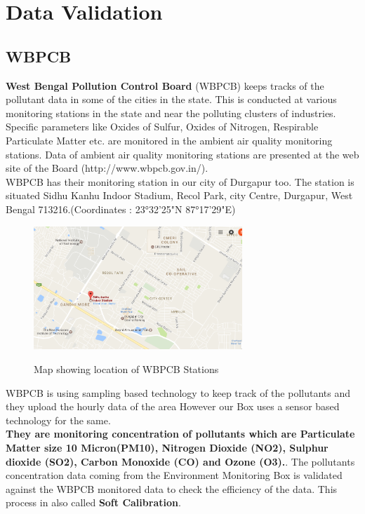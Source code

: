\chapter{Data Validation}

\section{WBPCB}

\textbf{West Bengal Pollution Control Board} (WBPCB) keeps tracks of the pollutant data in some of the cities in the state. This is conducted at various monitoring stations in the state and near the polluting clusters of industries. Specific parameters like Oxides of Sulfur, Oxides of Nitrogen, Respirable Particulate Matter etc. are monitored in the ambient air quality monitoring stations. Data of ambient air quality monitoring stations are presented at the web site of the Board (http://www.wbpcb.gov.in/). \\

WBPCB has their monitoring station in our city of Durgapur too. The station is situated Sidhu Kanhu Indoor Stadium, Recol Park, city Centre, Durgapur, West Bengal 713216.(Coordinates : 23°32'25"N   87°17'29"E)

\vspace{0.1in}

\begin{figure}[!htbp]
	\centering
	\includegraphics[width=0.7\textwidth]{wbpcb.png}
	\label{fig:Map showing location of WBPCB Stations}
	\caption{Map showing location of WBPCB Stations}
\end{figure}

WBPCB is using sampling based technology to keep track of the pollutants and they upload the hourly data of the area However our Box uses a sensor based technology for the same.\\

\textbf{They are monitoring concentration of pollutants which are Particulate Matter size 10 Micron(PM10), Nitrogen Dioxide (NO2), Sulphur dioxide (SO2), Carbon Monoxide (CO) and Ozone (O3).}.
The pollutants concentration data coming from the Environment Monitoring Box is validated against the WBPCB monitored data to check the efficiency of the data. This process in also called \textbf{Soft Calibration}.

